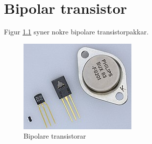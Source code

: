\documentclass[../../multi-file-example.tex]{subfiles}
\begin{document}
\chapter{Bipolar transistor}


Figur \ref{fig:bipolar-transistor-packages-picture} syner nokre bipolare transistorpakkar.

\begin{figure}[ht!]
	\includegraphics{img/bipolar-transistor.jpg}
	\caption{Bipolare transistorar}
	\label{fig:bipolar-transistor-packages-picture}
\end{figure}
\end{document}
